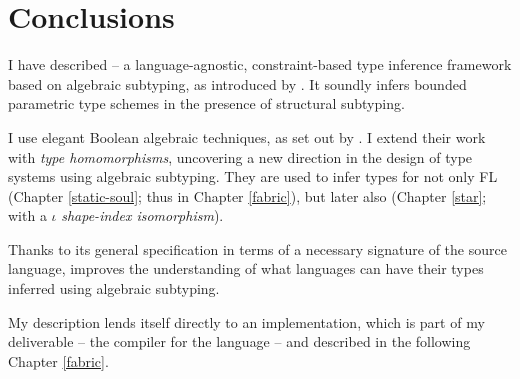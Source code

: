\section{Conclusions}
\label{sec:conclusions}

I have described \inference{} -- a language-agnostic, constraint-based type inference framework based on algebraic subtyping, as introduced by \textcite{mlsub}.
It soundly infers bounded parametric type schemes in the presence of structural subtyping. 

I use elegant Boolean algebraic techniques, as set out by \textcite{mlstruct}. I extend their work with \emph{type homomorphisms}, uncovering a new direction in the design of type systems using algebraic subtyping. They are used to infer types for not only FL (Chapter \ref{static-soul}; thus \fabric{} in Chapter \ref{fabric}), but later also \starr{} (Chapter \ref{star}; with a $\iota$ \emph{shape-index isomorphism}).

Thanks to its general specification in terms of a necessary signature of the source language, \inference{} improves the understanding of what languages can have their types inferred using algebraic subtyping.

My description lends itself directly to an implementation, which is part of my deliverable -- the \compiler{} compiler for the \fabric{} language -- and described in the following Chapter \ref{fabric}.
